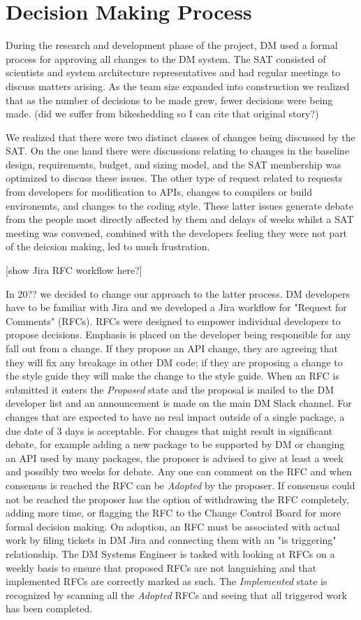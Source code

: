 \section{Decision Making Process}

During the research and development phase of the project, DM used a formal process for approving all changes to the DM system.
The SAT consisted of scientists and system architecture representatives and had regular meetings to discuss matters arising.
As the team size expanded into construction we realized that as the number of decisions to be made grew, fewer decisions were being made. (did we suffer from bikeshedding so I can cite that original story?)

We realized that there were two distinct classes of changes being discussed by the SAT.
On the one hand there were discussions relating to changes in the baseline design, requirements, budget, and sizing model, and the SAT membership was optimized to discuss these issues.
The other type of request related to requests from developers for modification to APIs, changes to compilers or build environemts, and changes to the coding style.
These latter issues generate debate from the people most directly affected by them and delays of weeks whilst a SAT meeting was convened, combined with the developers feeling they were not part of the deicsion making, led to much frustration.

[show Jira RFC workflow here?]

In 20?? we decided to change our approach to the latter process.
DM developers have to be familiar with Jira and we developed a Jira workflow for "Request for Comments" (RFCs).
RFCs were designed to empower individual developers to propose decisions.
Emphasis is placed on the developer being responsible for any fall out from a change.
If they propose an API change, they are agreeing that they will fix any breakage in other DM code; if they are proposing a change to the style guide they will make the change to the style guide.
When an RFC is submitted it enters the \emph{Proposed} state and the proposal is mailed to the DM developer list and an announcement is made on the main DM Slack channel.
For changes that are expected to have no real impact outside of a single package, a due date of 3 days is acceptable.
For changes that might result in significant debate, for example adding a new package to be supported by DM or changing an API used by many packages, the proposer is advised to give at least a week and possibly two weeks for debate.
Any one can comment on the RFC and when consensus is reached the RFC can be \emph{Adopted} by the proposer.
If consensus could not be reached the proposer has the option of withdrawing the RFC completely, adding more time, or flagging the RFC to the Change Control Board for more formal decision making.
On adoption, an RFC must be associated with actual work by filing tickets in DM Jira and connecting them with an "is triggering" relationship.
The DM Systems Engineer is tasked with looking at RFCs on a weekly basis to ensure that proposed RFCs are not languishing and that implemented RFCs are correctly marked as such.
The \emph{Implemented} state is recognized by scanning all the \emph{Adopted} RFCs and seeing that all triggered work has been completed.

